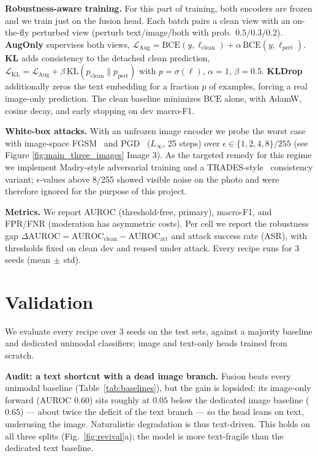 \documentclass{article}
\begin{document}
\textbf{Robustness-aware training.} For this part of training, both encoders are frozen and we train just on the fusion head. Each batch pairs a clean view with an
on-the-fly perturbed view (perturb text/image/both with prob.\
$0.5/0.3/0.2$). \textbf{AugOnly}
supervises both views, $\mathcal{L}_{\text{Aug}}=\text{BCE}(y,\ell_{\text{clean}})+\alpha\,\text{BCE}(y,\ell_{\text{pert}})$.
\textbf{KL} adds consistency to the detached clean prediction,
$\mathcal{L}_{\text{KL}}=\mathcal{L}_{\text{Aug}}+\beta\,\text{KL}(p_{\text{clean}}\|p_{\text{pert}})$
with $p=\sigma(\ell)$, $\alpha{=}1$, $\beta{=}0.5$. \textbf{KLDrop} additionally zeros
the text embedding for a fraction $p$ of examples, forcing a real image-only
prediction. The clean
baseline minimizes $\text{BCE}$ alone, with AdamW, cosine decay, and early
stopping on dev macro-F1.

\vspace{-5pt}
\textbf{White-box attacks.} With an unfrozen image encoder we probe the worst case with image-space
FGSM~\cite{goodfellow2015explaining} and PGD~\cite{madry2018towards} ($L_\infty$, 25 steps) over $\epsilon\in\{1,2,4,8\}/255$ (see Figure \ref{fig:main_three_images} Image 3). As the targeted remedy for this
regime we implement Madry-style adversarial training and a
TRADES-style~\cite{zhang2019theoretically} consistency variant; $\epsilon$-values above 8/255 showed visible noise on the photo and were therefore ignored for the purpose of this project.

\vspace{-5pt}
\textbf{Metrics.} We report AUROC (threshold-free, primary), macro-F1, and
FPR/FNR (moderation has asymmetric costs). Per cell we report the robustness gap
$\Delta\mathrm{AUROC}=\mathrm{AUROC}_{\text{clean}}-\mathrm{AUROC}_{\text{att}}$
and attack success rate (ASR), with thresholds fixed on clean dev and reused under
attack. Every recipe runs for $3$ seeds (mean$\,\pm\,$std).

\vskip -0.05in 
\section{Validation}
\label{sec:validation}

We evaluate every recipe over $3$ seeds on the test sets, against a majority baseline and dedicated unimodal
classifiers; image and text-only heads trained from scratch.

\vspace{-5pt}
\textbf{Audit: a text shortcut with a dead image branch.}
Fusion beats every unimodal baseline (Table~\ref{tab:baselines}), but the gain is
lopsided: its image-only forward (AUROC $0.60$) sits roughly at $0.05$ below the
dedicated image baseline ($0.65$) --- about twice the deficit of the text branch ---
so the head leans on text, underusing the image. Naturalistic degradation is
thus text-driven. This holds on all three splits
(Fig.~\ref{fig:revival}a); the model is more text-fragile than the
dedicated text baseline.
\end{document}
